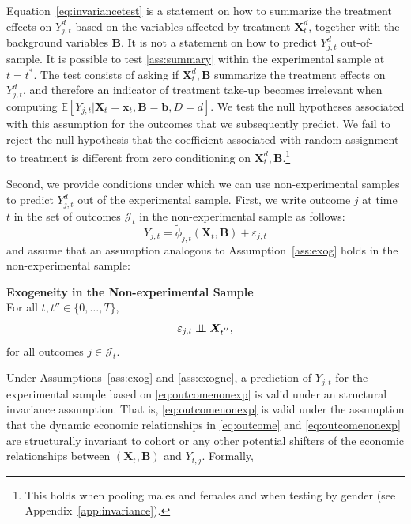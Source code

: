 Equation~\eqref{eq:invariancetest} is a statement on how to summarize the treatment effects on $Y_{j,t}^d$ based on the variables affected by treatment $\bm{X}_{t}^d$, together with the background variables $\bm{B}$. It is not a statement on how to predict $Y_{j,t}^d$ out-of-sample. It is possible to test \ref{ass:summary} within the experimental sample at $t = t^*$. The test consists of asking if $\bm{X}_{t}^d, \bm{B}$ summarize the treatment effects on  $Y_{j,t}^d$, and therefore an indicator of treatment take-up becomes irrelevant when computing $\mathbb{E} \left[ Y_{j,t} | \bm{X}_{t}  = \bm{x}_{t}, \bm{B} =  \bm{b}, D = d \right]$. We test the null hypotheses associated with this assumption for the outcomes that we subsequently predict. We fail to reject the null  hypothesis that the coefficient associated with random assignment to treatment is different from zero conditioning on $\bm{X}_{t}^d, \bm{B}$.\footnote{This holds when pooling males and females and when testing by gender (see Appendix~\ref{app:invariance}).}

Second, we provide conditions under which we can use non-experimental samples to predict $Y_{j,t}^d$ out of the experimental sample. First, we write outcome $j$ at time $t$ in the set of outcomes $\mathcal{J}_{t}$ in the non-experimental sample as follows:
\begin{equation}\label{eq:outcomenonexp}
Y_{j,t} = \widetilde{\phi}_{j,t} \left( \bm{X}_{t}, \bm{B} \right) + \varepsilon_{j,t}
\end{equation}
and assume that an assumption analogous to Assumption~\ref{ass:exog} holds in the non-experimental sample:

\begin{assumption}\label{ass:exogne} \textbf{Exogeneity in the Non-experimental Sample}\\
For all $t, t'' \in \{ 0, \ldots, T \}$,
\begin{equation}
\varepsilon_{j,t} \perp\!\!\!\perp \bm{X}_{t^{''}},
\end{equation}
\noindent for all outcomes $j \in \mathcal{J}_{t}$.
\end{assumption}

Under Assumptions~\ref{ass:exog} and \ref{ass:exogne}, a prediction of $Y_{j,t}$ for the experimental sample based on \eqref{eq:outcomenonexp} is valid under an structural invariance assumption. That is, \eqref{eq:outcomenonexp} is valid under the assumption that the dynamic economic relationships in \eqref{eq:outcome} and \eqref{eq:outcomenonexp} are structurally invariant to cohort or any other potential shifters of the economic relationships between $\left( \bm{X}_{t}, \bm{B} \right)$ and $Y_{t,j}$. Formally,

